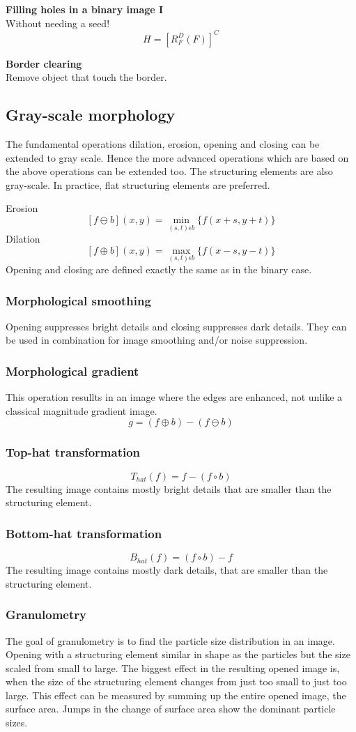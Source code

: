 \textbf{Filling holes in a binary image I}\\
Without needing a seed!\\
\[
	H = [R_F^D(F)]^C
\]

\textbf{Border clearing}\\
Remove object that touch the border.

\subsection{Gray-scale morphology}
The fundamental operations dilation, erosion, opening and closing can be extended to gray scale. Hence the more advanced operations which are based on the above operations can be extended too. The structuring elements are also gray-scale. In practice, flat structuring elements are preferred.


Erosion
\[
	[f\ominus b](x,y) = \min_{(s,t)\epsilon b} \{f(x+s,y+t)\}
\]
Dilation
\[
	[f\oplus b](x,y) = \max_{(s,t)\epsilon b} \{f(x-s,y-t)\}
\]
Opening and closing are defined exactly the same as in the binary case.
\subsubsection{Morphological smoothing}
Opening suppresses bright details and closing suppresses dark details. They can be used in combination for image smoothing and/or noise suppression.
\subsubsection{Morphological gradient}
This operation resullts in an image where the edges are enhanced, not unlike a classical magnitude gradient image.
\[
	g=(f\oplus b)-(f\ominus b)
\]
\subsubsection{Top-hat transformation}
\[
	T_{hat}(f) = f -(f \circ b)
\]
The resulting image contains mostly bright details that are smaller than the structuring element.
\subsubsection{Bottom-hat transformation}
\[
	B_{hat}(f) = (f \circ b)-f
\]
The resulting image contains mostly dark details, that are smaller than the structuring element.
\subsubsection{Granulometry}
The goal of granulometry is to find the particle size distribution in an image. Opening with a structuring element similar in shape as the particles but the size scaled from small to large. The biggest effect in the resulting opened image is, when the size of the structuring element changes from just too small to just too large. This effect can be measured by summing up the entire opened image, the surface area. Jumps in the change of surface area show the dominant particle sizes.